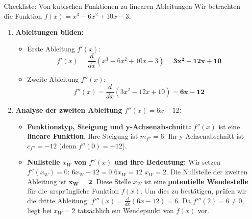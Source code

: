 \begin{loesungsumgebung}{Checkliste: Von kubischen Funktionen zu linearen Ableitungen}
Wir betrachten die Funktion $f(x) = x^3 - 6x^2 + 10x - 3$.

\begin{enumerate}[label=(\alph*)]
    \item \textbf{Ableitungen bilden:}
    \begin{itemize}
        \item Erste Ableitung $f'(x)$:
        $$ f'(x) = \frac{d}{dx}(x^3 - 6x^2 + 10x - 3) = \mathbf{3x^2 - 12x + 10} $$
        \item Zweite Ableitung $f''(x)$:
        $$ f''(x) = \frac{d}{dx}(3x^2 - 12x + 10) = \mathbf{6x - 12} $$
    \end{itemize}

    \item \textbf{Analyse der zweiten Ableitung $f''(x) = 6x - 12$:}
    \begin{itemize}
        \item \textbf{Funktionstyp, Steigung und y-Achsenabschnitt:}
        $f''(x)$ ist eine \textbf{lineare Funktion}.
        Ihre Steigung ist $m_{f''} = 6$.
        Ihr y-Achsenabschnitt ist $c_{f''} = -12$ (denn $f''(0) = -12$).
        \item \textbf{Nullstelle $x_W$ von $f''(x)$ und ihre Bedeutung:}
        Wir setzen $f''(x_W) = 0$:
        $6x_W - 12 = 0$
        $6x_W = 12$
        $x_W = 2$.
        Die Nullstelle der zweiten Ableitung ist $\mathbf{x_W = 2}$.
        Diese Stelle $x_W$ ist eine \textbf{potentielle Wendestelle} für die ursprüngliche Funktion $f(x)$. Um dies zu bestätigen, prüfen wir die dritte Ableitung:
        $f'''(x) = \frac{d}{dx}(6x - 12) = 6$.
        Da $f'''(2) = 6 \neq 0$, liegt bei $x_W=2$ tatsächlich ein Wendepunkt von $f(x)$ vor.
    \end{itemize}


\end{enumerate}
\end{loesungsumgebung}

